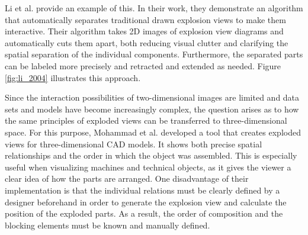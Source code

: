 Li et al. provide an example of this. In their work, they demonstrate an algorithm that automatically separates traditional drawn explosion views to make them interactive.
Their algorithm takes 2D images of explosion view diagrams and automatically cuts them apart, both reducing visual clutter and clarifying the spatial separation of the individual components. 
Furthermore, the separated parts can be labeled more precisely and retracted and extended as needed. Figure \ref{fig:li_2004} illustrates this approach.\cite{li2004interactive}

Since the interaction possibilities of two-dimensional images are limited and data sets and models have become increasingly complex, the question arises as to how the same principles of exploded views can be transferred to three-dimensional space.
For this purpose, Mohammad et al. developed a tool that creates exploded views for three-dimensional CAD models. It shows both precise spatial relationships and the order in which the object was assembled.\cite{Mohammad_1993}
This is especially useful when visualizing machines and technical objects, as it gives the viewer a clear idea of how the parts are arranged.
One disadvantage of their implementation is that the individual relations must be clearly defined by a designer beforehand in order to generate the explosion view and calculate the position of the exploded parts.
As a result, the order of composition and the blocking elements must be known and manually defined.

